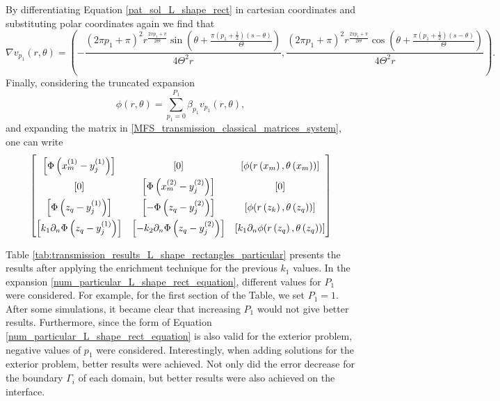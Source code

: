 By differentiating Equation \eqref{pat_sol_L_shape_rect} in cartesian coordinates and substituting polar coordinates again we find that
\begin{equation*}
    \nabla v_{p_1}(r, \theta) = \left(-\frac{(2 \pi  {p_1}+\pi )^2 r^{\frac{2 \pi  {p_1}+\pi }{2 \Theta }} \sin \left(\theta +\frac{\pi  \left(p_1+\frac{1}{2}\right) (s-\theta )}{\Theta }\right)}{4 \Theta ^2 r},\frac{(2 \pi  p_1+\pi )^2 r^{\frac{2 \pi  p_1+\pi }{2 \Theta }} \cos \left(\theta +\frac{\pi  \left(p_1+\frac{1}{2}\right) (s-\theta )}{\Theta }\right)}{4 \Theta ^2 r}\right).
\end{equation*}
Finally, considering the truncated expansion
\begin{equation}\label{num_particular_L_shape_rect_equation}
    \phi(r,\theta)=\sum_{p_1=0}^{P_1} \beta_{p_1} v_{p_1}(r, \theta),
\end{equation}
and expanding the matrix in \eqref{MFS_transmission_classical_matrices_system}, one can write
\begin{equation}\label{transmission_mat_L_rect_exp}
    \renewcommand{\arraystretch}{1.75} %
    \begin{bmatrix}
        \left[\Phi\left(x^{(1)}_{m}-y_j^{(1)}\right)\right] & [0] & \left[\phi(r\left(x_m\right),\theta\left(x_m\right))\right]\\
        [0] & \left[\Phi\left(x^{(2)}_{m}-y_j^{(2)}\right)\right] & \left[0\right]\\
        \left[\Phi\left(z_q-y_j^{(1)}\right)\right] & \left[-\Phi\left(z_q-y_j^{(2)}\right)\right] & \left[\phi(r\left(z_k\right),\theta\left(z_q\right))\right]\\
        \left[k_1\partial_n \Phi\left(z_q-y_j^{(1)}\right)\right] & \left[-k_2 \partial_n \Phi\left(z_q-y_j^{(2)}\right)\right] & \left[k_1 \partial_n\phi(r\left(z_q\right),\theta\left(z_q\right))\right]
    \end{bmatrix}
\end{equation}

Table \ref{tab:transmission_results_L_shape_rectangles_particular} presents the results after applying the enrichment technique for the previous \(k_1\) values. In the expansion \eqref{num_particular_L_shape_rect_equation}, different values for \(P_1\) were considered. For example, for the first section of the Table, we set \(P_1=1\). After some simulations, it became clear that increasing \(P_1\) would not give better results. Furthermore, since the form of Equation \eqref{num_particular_L_shape_rect_equation} is also valid for the exterior problem, negative values of \(p_1\) were considered. Interestingly, when adding solutions for the exterior problem, better results were achieved. Not only did the error decrease for the boundary \(\Gamma_i\) of each domain, but better results were also achieved on the interface.

